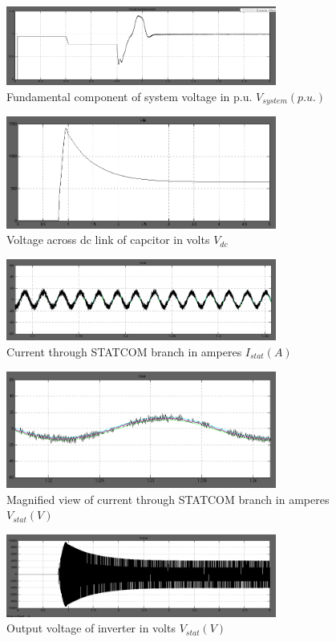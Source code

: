 \documentclass[journal,twoside]{IEEEtran}
\begin{document}
\begin{figure}[!ht]
\includegraphics[width=3.5in]{g}
\caption{Fundamental component of system voltage in p.u. $V_{system}(p.u.)$}
\label{fg }
\end{figure}


\begin{figure}[!ht]
\includegraphics[width=3.5in]{h}
\caption{Voltage across dc link of capcitor in volts $V_{dc}$}
\label{fh }
\end{figure}


\begin{figure}[!ht]
\includegraphics[width=3.5in]{i}
\caption{ Current through STATCOM branch in amperes $I_{stat}(A)$}
\label{fi }
\end{figure}


\begin{figure}[!ht]
\includegraphics[width=3.5in]{j}
\caption{Magnified view of current through STATCOM branch in amperes $V_{stat}(V)$}
\label{fj }
\end{figure}


\begin{figure}[!ht]
\includegraphics[width=3.5in]{k}
\caption{Output voltage of inverter in volts $V_{stat}(V)$ }
\label{fk }
\end{figure}
\end{document}
